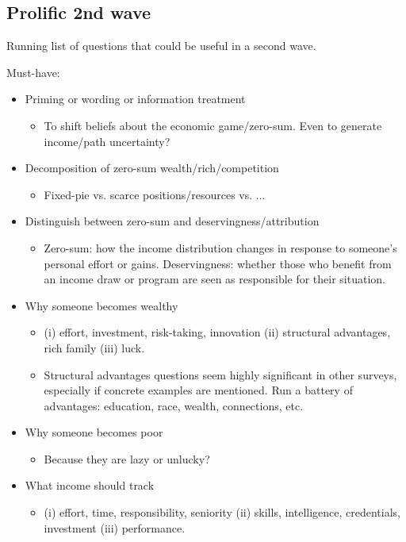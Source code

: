 \documentclass{article}
\begin{document}
\subsection*{Prolific 2nd wave}

Running list of questions that could be useful in a second wave.

Must-have:
\begin{itemize}
    \item Priming or wording or information treatment
    \begin{itemize}
        \item To shift beliefs about the economic game/zero-sum. Even to generate income/path uncertainty?
    \end{itemize}
    \item Decomposition of zero-sum wealth/rich/competition
    \begin{itemize}
        \item Fixed-pie vs. scarce positions/resources vs. ...
    \end{itemize}
    \item Distinguish between zero-sum and deservingness/attribution
    \begin{itemize}
        \item Zero-sum: how the income distribution changes in response to someone's personal effort or gains. Deservingness: whether those who benefit from an income draw or program are seen as responsible for their situation.
    \end{itemize}
    \item Why someone becomes wealthy
    \begin{itemize}
        \item (i) effort, investment, risk-taking, innovation (ii) structural advantages, rich family (iii) luck. 
        \item Structural advantages questions seem highly significant in other surveys, especially if concrete examples are mentioned. Run a battery of advantages: education, race, wealth, connections, etc.
    \end{itemize}
    \item Why someone becomes poor
    \begin{itemize}
        \item Because they are lazy or unlucky?
    \end{itemize}
    \item What income should track 
    \begin{itemize}
        \item (i) effort, time, responsibility, seniority (ii) skills, intelligence, credentials, investment (iii) performance.

\end{itemize}
\end{itemize}
\end{document}
